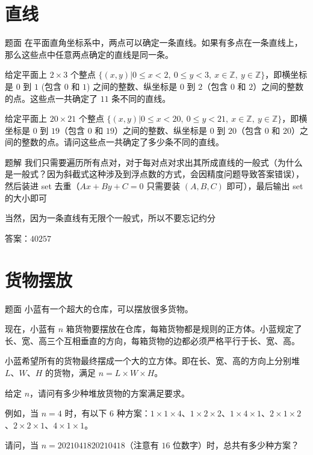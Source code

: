 \documentclass{pptt}
\begin{document}
\section{直线}

\begin{frame}{题面}
    在平面直角坐标系中，两点可以确定一条直线。如果有多点在一条直线上，那么这些点中任意两点确定的直线是同一条。

    给定平面上 $2 \times 3$ 个整点 $\{(x,y)|0 \leq x < 2,~0 \leq y < 3,~x \in \mathbb{Z},~y \in \mathbb{Z}\}$，即横坐标是 $0$ 到 $1$ (包含 $0$ 和 $1$) 之间的整数、纵坐标是 $0$ 到 $2$（包含 $0$ 和 $2$）之间的整数的点。这些点一共确定了 $11$ 条不同的直线。

    给定平面上 $20 \times 21$ 个整点 $\{(x,y)|0 \leq x < 20,~0 \leq y < 21,~x \in \mathbb{Z},~y \in \mathbb{Z}\}$，即横坐标是 $0$ 到 $19$（包含 $0$ 和 $19$）之间的整数、纵坐标是 $0$ 到 $20$（包含 $0$ 和 $20$）之间的整数的点。请问这些点一共确定了多少条不同的直线。
\end{frame}

\begin{frame}{题解}
    我们只需要遍历所有点对，对于每对点对求出其所成直线的一般式（为什么是一般式？因为斜截式这种涉及到浮点数的方式，会因精度问题导致答案错误），然后装进 set 去重（$Ax+By+C=0$ 只需要装 $(A,B,C)$ 即可），最后输出 set 的大小即可

    当然，因为一条直线有无限个一般式，所以不要忘记约分

    答案：$40257$
\end{frame}

\section{货物摆放}

\begin{frame}{题面}
    小蓝有一个超大的仓库，可以摆放很多货物。

    现在，小蓝有 $n$ 箱货物要摆放在仓库，每箱货物都是规则的正方体。小蓝规定了长、宽、高三个互相垂直的方向，每箱货物的边都必须严格平行于长、宽、高。

    小蓝希望所有的货物最终摆成一个大的立方体。即在长、宽、高的方向上分别堆 $L$、$W$、$H$ 的货物，满足 $n=L \times W \times H$。

    给定 $n$，请问有多少种堆放货物的方案满足要求。

    例如，当 $n=4$ 时，有以下 $6$ 种方案：$1 \times 1 \times 4$、$1 \times 2 \times 2$、$1 \times 4 \times 1$、$2 \times 1 \times 2$、$2 \times 2 \times 1$、$4 \times 1 \times 1$。

    请问，当 $n=2021041820210418$（注意有 $16$ 位数字）时，总共有多少种方案？
\end{frame}
\end{document}
